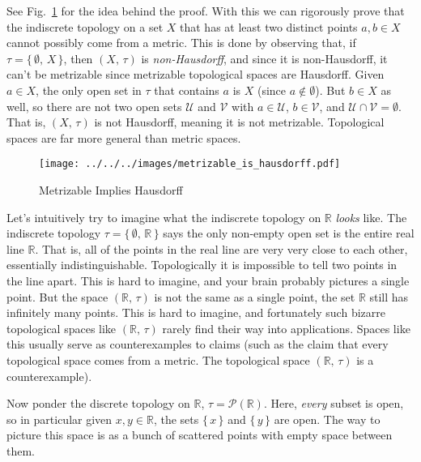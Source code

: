 \documentclass{article}
\theoremstyle{plain}
\theoremstyle{normal}
\newenvironment{example}{%
    \pushQED{\qed}\renewcommand{\qedsymbol}{$\blacksquare$}\examplex%
}{%
    \popQED\endexamplex%
}
\begin{document}
    See Fig.~\ref{fig:metrizable_is_hausdorff} for the idea behind the proof.
    With this we can rigorously prove that the indiscrete topology on a set
    $X$ that has at least two distinct points $a,b\in{X}$ cannot possibly
    come from a metric. This is done by observing that, if
    $\tau=\{\,\emptyset,\,X\,\}$, then $(X,\,\tau)$ is
    \textit{non-Hausdorff}, and since it is non-Hausdorff, it can't
    be metrizable since metrizable topological spaces are Hausdorff. Given
    $a\in{X}$, the only open set in $\tau$ that contains $a$ is
    $X$ (since $a\notin\emptyset$). But $b\in{X}$ as well, so
    there are not two open sets $\mathcal{U}$ and $\mathcal{V}$ with
    $a\in\mathcal{U}$, $b\in\mathcal{V}$, and
    $\mathcal{U}\cap\mathcal{V}=\emptyset$. That is, $(X,\,\tau)$ is not
    Hausdorff, meaning it is not metrizable. Topological spaces are
    far more general than metric spaces.
    \begin{figure}
        \centering
        \texttt{[image: ../../../images/metrizable\_is\_hausdorff.pdf]}
        \caption{Metrizable Implies Hausdorff}
        \label{fig:metrizable_is_hausdorff}
    \end{figure}
    \begin{example}
        Let's intuitively try to imagine what the indiscrete
        topology on $\mathbb{R}$ \textit{looks} like. The indiscrete topology
        $\tau=\{\,\emptyset,\,\mathbb{R}\,\}$ says the only non-empty open set
        is the entire real line $\mathbb{R}$. That is, all of the points in the
        real line are very very close to each other, essentially
        indistinguishable. Topologically it is impossible to tell
        two points in the line apart. This is hard to imagine, and your brain
        probably pictures a single point. But the space $(\mathbb{R},\,\tau)$
        is not the same as a single point, the set $\mathbb{R}$ still has
        infinitely many points. This is hard to imagine, and fortunately such
        bizarre topological spaces like $(\mathbb{R},\,\tau)$ rarely find their
        way into applications. Spaces like this usually serve as counterexamples
        to claims (such as the claim that every topological space comes from a
        metric. The topological space $(\mathbb{R},\,\tau)$ is a
        counterexample).
    \end{example}
    \begin{example}
        Now ponder the discrete topology on $\mathbb{R}$,
        $\tau=\mathcal{P}(\mathbb{R})$. Here, \textit{every} subset is open,
        so in particular given $x,y\in\mathbb{R}$, the sets
        $\{\,x\,\}$ and $\{\,y\,\}$ are open. The way to picture this space is
        as a bunch of scattered points with empty space between them.
    \end{example}
\end{document}
